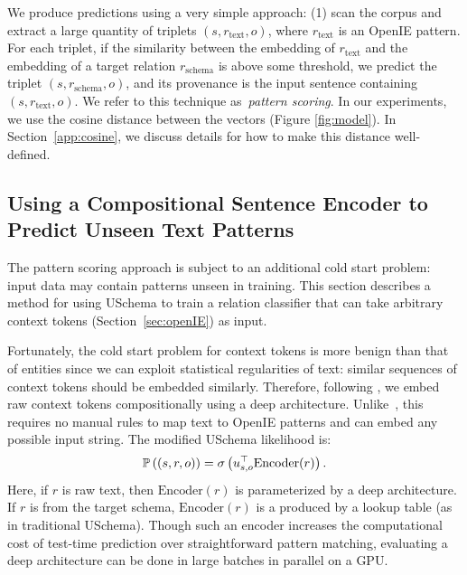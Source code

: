 We produce predictions using a very simple approach: (1) scan the corpus and extract a large quantity of triplets $(s,r_{\text{text}},o)$, where $r_{\text{text}}$ is an OpenIE pattern. For each triplet, if the similarity between the embedding of $r_{\text{text}}$ and the embedding of a target relation $r_{\text{schema}}$ is above some threshold, we predict the triplet $(s,r_{\text{schema}},o)$, and its provenance is the input sentence containing $(s,r_{\text{text}},o)$. We refer to this technique as~\textit{pattern scoring}. In our experiments, we use the cosine distance between the vectors (Figure \ref{fig:model}).
In Section~\ref{app:cosine}, we discuss details for how to make this distance well-defined.


\subsection{Using a Compositional Sentence Encoder to Predict Unseen Text Patterns \label{sec:encoder}}
The pattern scoring approach is subject to an additional cold start problem: input data may contain patterns unseen in training. This section describes a method for using USchema to train a relation classifier that can take arbitrary context tokens (Section~\ref{sec:openIE}) as input.

Fortunately, the cold start problem for context tokens is more benign than that of entities since we can exploit statistical regularities of text: similar sequences of context tokens should be embedded similarly. Therefore, following \citet{toutanova2015representing}, we  embed raw context tokens compositionally using a deep architecture. Unlike~\citet{limin}, this requires no manual rules to map text to OpenIE patterns and can embed any possible input string. The modified USchema likelihood is:
\begin{equation}
\mathbb{P} \left((s,r,o)\right) = \sigma\left( u_{s,o}^\top \text{Encoder}(r) \right).
\end{equation}
Here, if $r$ is raw text, then $\text{Encoder}(r)$ is parameterized by a deep architecture. If $r$ is from the target schema, $\text{Encoder}(r)$ is a produced by a lookup table (as in traditional USchema). Though such an encoder increases the computational cost of test-time prediction over straightforward pattern matching, evaluating a deep architecture can be done in large batches in parallel on a GPU.

